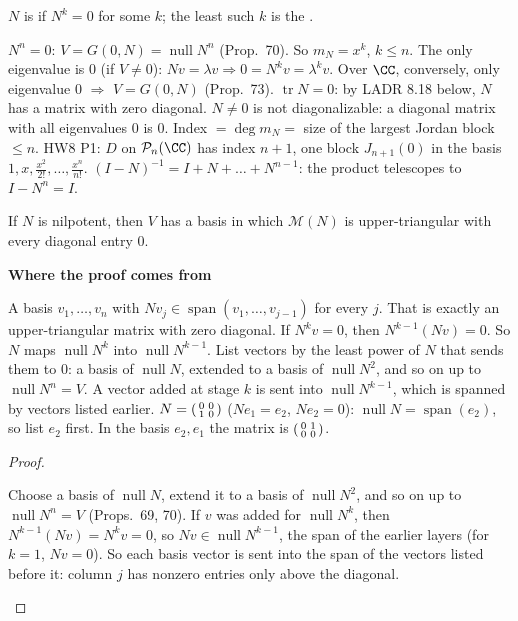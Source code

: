 \documentclass[10pt]{scrartcl}
\DeclareMathOperator{\nul}{null}
\DeclareMathOperator{\spn}{span}
\DeclareMathOperator{\tr}{tr}
\newcommand{\PP}{\mathcal P}
\newcommand{\MM}{\mathcal M}
\newenvironment{motive}{\begin{mdframed}[style=thinkbox]\textbf{\color{OliveGreen!75!black}Where the proof comes from}\begin{description}[leftmargin=0.9em,labelindent=0pt,itemsep=2pt,topsep=2pt,font=\normalfont\bfseries\color{OliveGreen!70!black}]}{\end{description}\end{mdframed}}
\newenvironment{steps}{\begin{enumerate}[label=\arabic*.,leftmargin=1.5em,itemsep=2pt,topsep=2pt]}{\end{enumerate}}
\begin{document}
\begin{definition*}[Def.~39]
  $N$ is  if $N^k=0$ for some $k$; the least such $k$ is the .
\end{definition*}
\begin{itemize}
  \ii $N^n=0$: $V=G(0,N)=\nul N^n$ (Prop.~70). So $m_N=x^k$, $k\le n$.
  \ii The only eigenvalue is $0$ (if $V\ne0$): $Nv=\lambda v\Rightarrow0=N^kv=\lambda^kv$. Over $\CC$, conversely, only eigenvalue $0$ $\Rightarrow$ $V=G(0,N)$ (Prop.~73).
  \ii $\tr N=0$: by LADR 8.18 below, $N$ has a matrix with zero diagonal.
  \ii $N\ne0$ is not diagonalizable: a diagonal matrix with all eigenvalues $0$ is $0$.
  \ii Index $=\deg m_N=$ size of the largest Jordan block $\le n$. HW8 P1: $D$ on $\PP_n(\CC)$ has index $n+1$, one block $J_{n+1}(0)$ in the basis $1,x,\frac{x^2}{2!},\dots,\frac{x^n}{n!}$.
  \ii $(I-N)^{-1}=I+N+\dots+N^{n-1}$: the product telescopes to $I-N^n=I$.
\end{itemize}

\begin{proposition*}
  If $N$ is nilpotent, then $V$ has a basis in which $\MM(N)$ is upper-triangular with every diagonal entry $0$.
\end{proposition*}
\begin{motive}
  \ii[Want.] A basis $v_1,\dots,v_n$ with $Nv_j\in\spn(v_1,\dots,v_{j-1})$ for every $j$. That is exactly an upper-triangular matrix with zero diagonal.
  \ii[Know.] If $N^kv=0$, then $N^{k-1}(Nv)=0$. So $N$ maps $\nul N^k$ into $\nul N^{k-1}$.
   List vectors by the least power of $N$ that sends them to $0$: a basis of $\nul N$, extended to a basis of $\nul N^2$, and so on up to $\nul N^n=V$. A vector added at stage $k$ is sent into $\nul N^{k-1}$, which is spanned by vectors listed earlier.
  \ii[Example.] $N=\begin{psmallmatrix}0&0\\1&0\end{psmallmatrix}$ ($Ne_1=e_2$, $Ne_2=0$): $\nul N=\spn(e_2)$, so list $e_2$ first. In the basis $e_2,e_1$ the matrix is $\begin{psmallmatrix}0&1\\0&0\end{psmallmatrix}$.
\end{motive}
\begin{proof}
  \begin{steps}
    \ii Choose a basis of $\nul N$, extend it to a basis of $\nul N^2$, and so on up to $\nul N^n=V$ (Props.~69, 70).
    \ii If $v$ was added for $\nul N^k$, then $N^{k-1}(Nv)=N^kv=0$, so $Nv\in\nul N^{k-1}$, the span of the earlier layers (for $k=1$, $Nv=0$).
    \ii So each basis vector is sent into the span of the vectors listed before it: column $j$ has nonzero entries only above the diagonal.
  \end{steps}
\end{proof}
\end{document}
